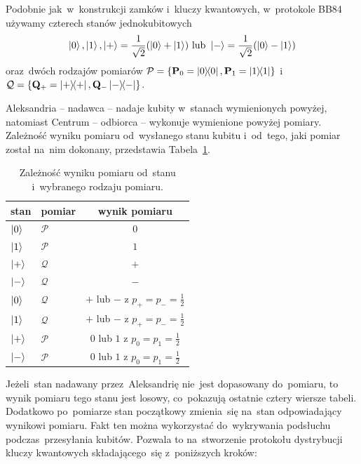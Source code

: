 Podobnie jak~w~konstrukcji zamków i~kluczy kwantowych, w~protokole BB84 używamy
czterech stanów jednokubitowych
$$
	\ket{0}, \ket{1}, \ket{+}=\frac{1}{\sqrt{2}}(\ket{0}+\ket{1})
	\text{ lub } \ket{-}=\frac{1}{\sqrt{2}}(\ket{0}-\ket{1})
$$
oraz~dwóch rodzajów pomiarów
$\mathcal{P}=\{\mathbf{P}_0=\ketbra{0}{0}, \mathbf{P}_1=\ketbra{1}{1}\}$ i
$\mathcal{Q}=\{\mathbf{Q}_+=\ketbra{+}{+}, \mathbf{Q}_-\ketbra{-}{-}\}$.

Aleksandria -- nadawca -- nadaje kubity w~stanach wymienionych powyżej, natomiast Centrum
-- odbiorca -- wykonuje wymienione powyżej pomiary. Zależność wyniku
pomiaru od~wysłanego stanu kubitu i~od~tego, jaki pomiar został na~nim dokonany, przedstawia
Tabela~\ref{tab:bb84}.

\begin{table}[h]
	\begin{center}
		\begin{tabular}{llc}
			stan      & pomiar        & wynik pomiaru                       \\
			\toprule
			$\ket{0}$ & $\mathcal{P}$ & $0$                                 \\
			\midrule
			$\ket{1}$ & $\mathcal{P}$ & $1$                                 \\
			\midrule
			$\ket{+}$ & $\mathcal{Q}$ & $+$                                 \\
			\midrule
			$\ket{-}$ & $\mathcal{Q}$ & $-$                                 \\
			\midrule
			$\ket{0}$ & $\mathcal{Q}$ & $+$ lub $-$ z $p_+=p_-=\frac{1}{2}$ \\
			\midrule
			$\ket{1}$ & $\mathcal{Q}$ & $+$ lub $-$ z $p_+=p_-=\frac{1}{2}$ \\
			\midrule
			$\ket{+}$ & $\mathcal{P}$ & $0$ lub $1$ z $p_0=p_1=\frac{1}{2}$ \\
			\midrule
			$\ket{-}$ & $\mathcal{P}$ & $0$ lub $1$ z $p_0=p_1=\frac{1}{2}$ \\
		\end{tabular}
		\caption{Zależność wyniku pomiaru od~stanu i~wybranego rodzaju pomiaru.}
		\label{tab:bb84}
	\end{center}
\end{table}

Jeżeli~stan nadawany przez~Aleksandrię nie~jest dopasowany do~pomiaru,
to wynik pomiaru tego stanu jest losowy, co~pokazują ostatnie cztery wiersze
tabeli. Dodatkowo po~pomiarze stan początkowy zmienia~się na~stan
odpowiadający wynikowi pomiaru. Fakt ten można wykorzystać do~wykrywania
podsłuchu podczas~przesyłania kubitów. Pozwala to na~stworzenie
protokołu dystrybucji kluczy kwantowych składającego~się z~poniższych
kroków:

